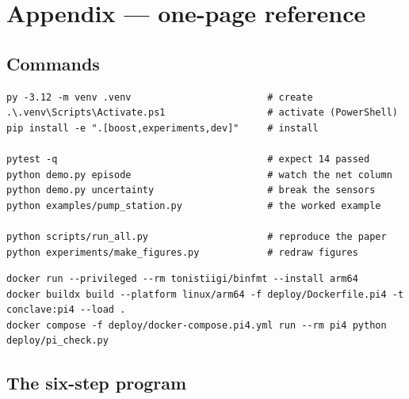 \section*{Appendix --- one-page reference}

\subsection*{Commands}

\begin{codebox}
\begin{lstlisting}[style=shell]
py -3.12 -m venv .venv                        # create
.\.venv\Scripts\Activate.ps1                  # activate (PowerShell)
pip install -e ".[boost,experiments,dev]"     # install

pytest -q                                     # expect 14 passed
python demo.py episode                        # watch the net column
python demo.py uncertainty                    # break the sensors
python examples/pump_station.py               # the worked example

python scripts/run_all.py                     # reproduce the paper
python experiments/make_figures.py            # redraw figures
\end{lstlisting}
\end{codebox}

\begin{codebox}
\begin{lstlisting}[style=shell]
docker run --privileged --rm tonistiigi/binfmt --install arm64
docker buildx build --platform linux/arm64 -f deploy/Dockerfile.pi4 -t conclave:pi4 --load .
docker compose -f deploy/docker-compose.pi4.yml run --rm pi4 python deploy/pi_check.py
\end{lstlisting}
\end{codebox}

\subsection*{The six-step program}


